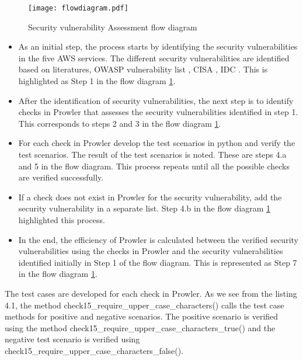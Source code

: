 \begin{figure}
    \centering
    \texttt{[image: flowdiagram.pdf]}
    \caption{Security vulnerability Assessment flow diagram}
    \label{fig:flowdiagram}
\end{figure}
\begin{itemize}
    \item As an initial step, the process starts by identifying the security vulnerabilities in the five AWS services.
    The different security vulnerabilities are identified
    based on literatures, OWASP vulnerability list
    \cite{51}, CISA \cite{52}, IDC \cite{53}.
    This is highlighted as Step 1 in the flow diagram \ref{fig:flowdiagram}.
\end{itemize}
\begin{itemize}
    \item After the identification of security vulnerabilities, the next step is to identify checks in Prowler that assesses the security vulnerabilities identified in step 1.
    This corresponds to steps 2 and 3 in the flow diagram \ref{fig:flowdiagram}.
\end{itemize}
\begin{itemize}
    \item For each check in Prowler develop the test scenarios in python and verify the test scenarios. The result of the test scenarios is noted. These are steps 4.a and 5 in the flow diagram. This process repeats until all the possible checks are verified successfully.
\end{itemize}
\begin{itemize}
    \item If a check does not exist in Prowler for the security vulnerability, add the security vulnerability in a separate list.
    Step 4.b in the flow diagram \ref{fig:flowdiagram} highlighted this process.
\end{itemize}
\begin{itemize}
    \item In the end, the efficiency of Prowler is calculated between the verified security vulnerabilities using the checks in Prowler and the security vulnerabilities identified initially in Step 1 of the flow diagram.
    This is represented as Step 7 in the flow diagram \ref{fig:flowdiagram}.
\end{itemize}


\par The test cases are developed for each check in Prowler.
As we see from the listing
4.1, the method check15\_require\_upper\_case\_characters() calls the test case methods
for positive and negative scenarios.
The positive scenario is verified using the method
check15\_require\_upper\_case\_characters\_true() and the negative test scenario is verified
using check15\_require\_upper\_case\_characters\_false().

